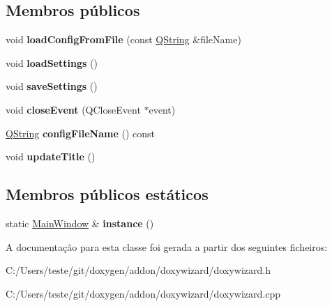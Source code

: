 \subsection*{Membros públicos}
\begin{DoxyCompactItemize}
\item 
\hypertarget{class_main_window_a9f2b2bae73ef6d27dff7822ee47d4915}{void {\bfseries load\-Config\-From\-File} (const \hyperlink{class_q_string}{Q\-String} \&file\-Name)}\label{class_main_window_a9f2b2bae73ef6d27dff7822ee47d4915}

\item 
\hypertarget{class_main_window_a1165e1d4439a045e94970c9fbc73bb3c}{void {\bfseries load\-Settings} ()}\label{class_main_window_a1165e1d4439a045e94970c9fbc73bb3c}

\item 
\hypertarget{class_main_window_ac7142ee2baa705d2dd402769467d5a4e}{void {\bfseries save\-Settings} ()}\label{class_main_window_ac7142ee2baa705d2dd402769467d5a4e}

\item 
\hypertarget{class_main_window_a5de2bd09256045c0b96e5a0be780fa85}{void {\bfseries close\-Event} (Q\-Close\-Event $\ast$event)}\label{class_main_window_a5de2bd09256045c0b96e5a0be780fa85}

\item 
\hypertarget{class_main_window_a53864467d25cefb7062584e229616aa2}{\hyperlink{class_q_string}{Q\-String} {\bfseries config\-File\-Name} () const }\label{class_main_window_a53864467d25cefb7062584e229616aa2}

\item 
\hypertarget{class_main_window_af5384ac1cb903cb08c3dd584b91ec166}{void {\bfseries update\-Title} ()}\label{class_main_window_af5384ac1cb903cb08c3dd584b91ec166}

\end{DoxyCompactItemize}
\subsection*{Membros públicos estáticos}
\begin{DoxyCompactItemize}
\item 
\hypertarget{class_main_window_a695ba1ad3fa913d74074a3cbe199349d}{static \hyperlink{class_main_window}{Main\-Window} \& {\bfseries instance} ()}\label{class_main_window_a695ba1ad3fa913d74074a3cbe199349d}

\end{DoxyCompactItemize}


A documentação para esta classe foi gerada a partir dos seguintes ficheiros\-:\begin{DoxyCompactItemize}
\item 
C\-:/\-Users/teste/git/doxygen/addon/doxywizard/doxywizard.\-h\item 
C\-:/\-Users/teste/git/doxygen/addon/doxywizard/doxywizard.\-cpp\end{DoxyCompactItemize}
